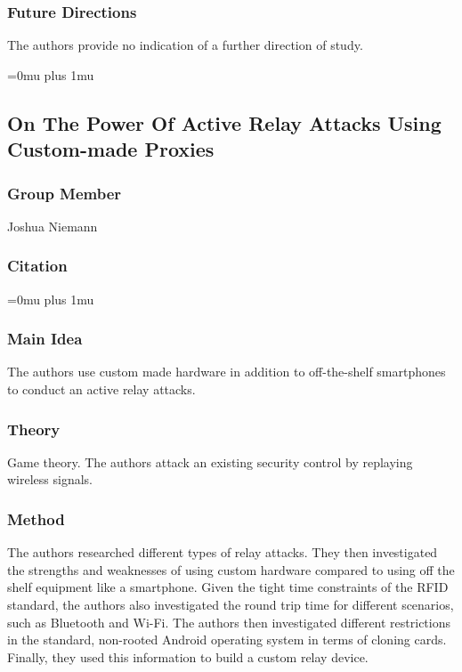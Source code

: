 \subsubsection{Future Directions}

\noindent
The authors provide no indication of a further direction of study. 

\Urlmuskip=0mu plus 1mu\relax

\noindent
\subsection{{O}n {T}he {P}ower {O}f {A}ctive {R}elay {A}ttacks {U}sing {C}ustom-made {P}roxies}

\subsubsection{Group Member}

\noindent
Joshua Niemann

\noindent
\subsubsection{Citation}

\Urlmuskip=0mu plus 1mu\relax

\subsubsection{Main Idea}

\noindent
The authors use custom made hardware in addition to off-the-shelf smartphones to conduct an active relay attacks.

\subsubsection{Theory}

\noindent
Game theory.  The authors attack an existing security control by replaying wireless signals.

\subsubsection{Method}

\noindent
The authors researched different types of relay attacks.  They then investigated the strengths and weaknesses of using custom hardware compared to using off the shelf equipment like a smartphone.  Given the tight time constraints of the RFID standard, the authors also investigated the round trip time for different scenarios, such as Bluetooth and Wi-Fi.  The authors then investigated different restrictions in the standard, non-rooted Android operating system in terms of cloning cards.  Finally, they used this information to build a custom relay device.

